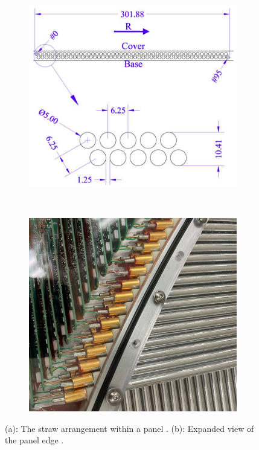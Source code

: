 \begin{figure}[!h]
\begin{subfigure}[t]{0.5\textwidth}
    \centering
    \includegraphics[width =\textwidth]{figures/png/Screenshot_20240326_234405.png}
    \caption{}
    \label{fig:trktubes}
    \end{subfigure}
    ~
    \begin{subfigure}[t]{0.5\textwidth}
        \centering
        \includegraphics[width =\textwidth]{figures/png/Screenshot_20240327_000131.png}
        \caption{}
        \label{fig:strawtubes}
        \end{subfigure}
        \caption[The straw arrangement within a panel.]{(a): The straw arrangement within a panel \cite{trk}. (b): Expanded view of the panel edge \cite{trk}.}
    \end{figure}

